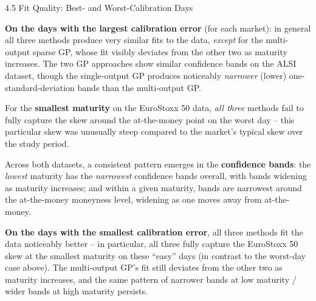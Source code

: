 \documentclass[aspectratio=169,10pt]{beamer}
\begin{document}
\begin{frame}[allowframebreaks]{4.5 Fit Quality: Best- and Worst-Calibration Days}

\textbf{On the days with the largest calibration error} (for each
market): in general all three methods produce very similar fits to the
data, \emph{except} for the multi-output sparse GP, whose fit visibly
deviates from the other two as maturity increases. The two GP approaches
show similar confidence bands on the ALSI dataset, though the
single-output GP produces noticeably \emph{narrower} (lower)
one-standard-deviation bands than the multi-output GP.

For the \textbf{smallest maturity} on the EuroStoxx 50 data, \emph{all
three} methods fail to fully capture the skew around the at-the-money
point on the worst day -- this particular skew was unusually steep
compared to the market's typical skew over the study period.

\framebreak

Across both datasets, a consistent pattern emerges in the
\textbf{confidence bands}: the \emph{lowest} maturity has the
\emph{narrowest} confidence bands overall, with bands widening as
maturity increases; and within a given maturity, bands are narrowest
around the at-the-money moneyness level, widening as one moves away from
at-the-money.

\textbf{On the days with the smallest calibration error}, all three
methods fit the data noticeably better -- in particular, all three fully
capture the EuroStoxx 50 skew at the smallest maturity on these
``easy'' days (in contrast to the worst-day case above). The
multi-output GP's fit still deviates from the other two as maturity
increases, and the same pattern of narrower bands at low maturity /
wider bands at high maturity persists.

\end{frame}
\end{document}
